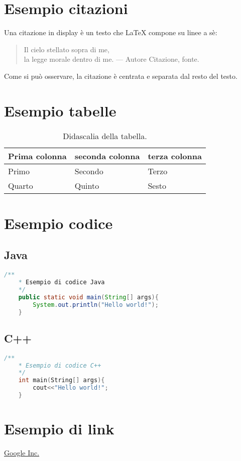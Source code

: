 \section{Esempio citazioni}
Una citazione in display è
un testo che \LaTeX{} compone
su linee a sè:
\begin{quote}\begin{footnotesize} 
 
	Il cielo stellato sopra di me,\\
	la legge morale dentro di me.
	\flushright
		--- Autore Citazione, fonte.
 
\end{footnotesize} 
\end{quote}
Come si può osservare, la
citazione è centrata e
separata dal resto del testo.

\section{Esempio tabelle}
\begin{table}[h]
\begin{tabular}{|l|l|l|}
\hline
\textbf{Prima colonna} & \textbf{seconda colonna} & \textbf{terza colonna} \\
\hline %
Primo & Secondo & Terzo \\
\hline
Quarto & Quinto & Sesto \\
\hline
\end{tabular}
\caption{Didascalia della tabella.}
\end{table}

\section{Esempio codice}
\subsection{Java}
\begin{lstlisting}[language=Java]
	/**
	* Esempio di codice Java
	*/
	public static void main(String[] args){
		System.out.println("Hello world!");
	}
\end{lstlisting}

\subsection{C++}
\begin{lstlisting}[language=C++]
	/**
	* Esempio di codice C++
	*/
	int main(String[] args){
		cout<<"Hello world!";
	}
\end{lstlisting}

\section{Esempio di link}
\href{http://www.google.com/}{Google Inc.}\cite{titDocumento} %